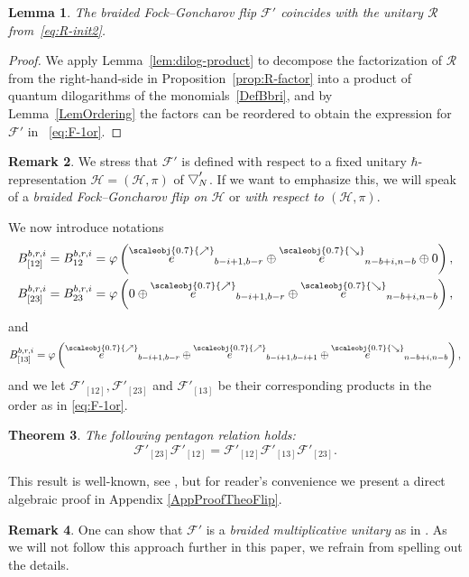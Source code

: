 \documentclass[11pt, reqno]{amsart}
\newtheorem{theorem}{Theorem}[section]
\newtheorem{lemma}[theorem]{Lemma}
\theoremstyle{definition}
\newtheorem{remark}[theorem]{Remark}
\numberwithin{equation}{section}
\def\beq{\begin{equation}}
\def\eeq{\end{equation}}
\newcommand{\hr}[1]{\left(#1\right)}                                                    %
\def\Fc{\mathcal F'}
\def\Hc{\mathcal H}
\newcommand{\nears}{\scaleobj{0.7}{\nearrow}}
\newcommand{\sears}{\scaleobj{0.7}{\searrow}}
\newcommand{\nee}{\overset{\nears}{e}}
\newcommand{\seee}{\overset{\sears}{e}}
\newcommand{\wbtd}[1]{\raisebox{\depth}{$\bigtriangledown'$\!\!}_{#1}}
\begin{document}
\begin{lemma}
    The braided Fock--Goncharov flip $\mathcal{F}'$ coincides with the unitary $\mathcal{R}$ from~\eqref{eq:R-init2}.
\end{lemma}
\begin{proof}
We apply Lemma~\ref{lem:dilog-product} to decompose the factorization of $\mathcal{R}$ from the right-hand-side in Proposition~\ref{prop:R-factor} into a product of quantum dilogarithms of the monomials~\eqref{DefBbri}, and by Lemma~\ref{LemOrdering} the factors can be reordered to obtain the expression for $\mathcal{F}'$ in ~\eqref{eq:F-1or}.
\end{proof}

\begin{remark}
We stress that $\Fc$ is defined with respect to a fixed unitary $\hbar$-representation $\Hc = (\Hc,\pi)$ of $\wbtd{N}$. If we want to emphasize this, we will speak of a \emph{braided Fock--Goncharov flip on $\Hc$} or \emph{with respect to $(\Hc,\pi)$}. 
\end{remark}

We now introduce notations
\begin{align*}
B_{[12]}^{b,r,i} = B_{12}^{b,r,i}= 
\varphi\hr{\nee_{b-i+1,b-r} \oplus \seee_{n-b+i,n-b} \oplus 0}, \\
B_{[23]}^{b,r,i} = B_{23}^{b,r,i}= 
\varphi\hr{0 \oplus \nee_{b-i+1,b-r} \oplus \seee_{n-b+i,n-b}},
\end{align*}
and
$$
B_{[13]}^{b,r,i} = 
\varphi\hr{\nee_{b-i+1,b-r} \oplus \nee_{b-i+1,b-i+1} \oplus \seee_{n-b+i,n-b}},
$$
and we let $\Fc_{[12]},\Fc_{[23]}$ and $\Fc_{[13]}$ be their corresponding products in the order as in \eqref{eq:F-1or}.

\begin{theorem}\label{TheoFlip}
The following pentagon relation holds:
\beq
\label{EqBraidPent}
\Fc_{[23]} \Fc_{[12]} = \Fc_{[12]} \Fc_{[13]} \Fc_{[23]}.
\eeq
\end{theorem}

This result is well-known, see \cite{DGG16}, but for reader's convenience we present a direct algebraic proof in Appendix \ref{AppProofTheoFlip}.

\begin{remark}
One can show that $\Fc$ is a \emph{braided multiplicative unitary} as in \cite[Definition 3.2]{MRW17}. As we will not follow this approach further in this paper, we refrain from spelling out the details.
\end{remark} 
\end{document}
